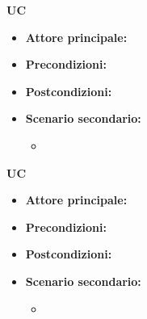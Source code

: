 \textbf{UC}
\begin{itemize}
\item \textbf{Attore principale:}
\item \textbf{Precondizioni:} 
\item \textbf{Postcondizioni:} 
\item \textbf{Scenario secondario:}
\begin{itemize}
    \item 
\end{itemize}
\end{itemize}

\textbf{UC}
\begin{itemize}
\item \textbf{Attore principale:}
\item \textbf{Precondizioni:} 
\item \textbf{Postcondizioni:} 
\item \textbf{Scenario secondario:}
\begin{itemize}
    \item 
\end{itemize}
\end{itemize}


